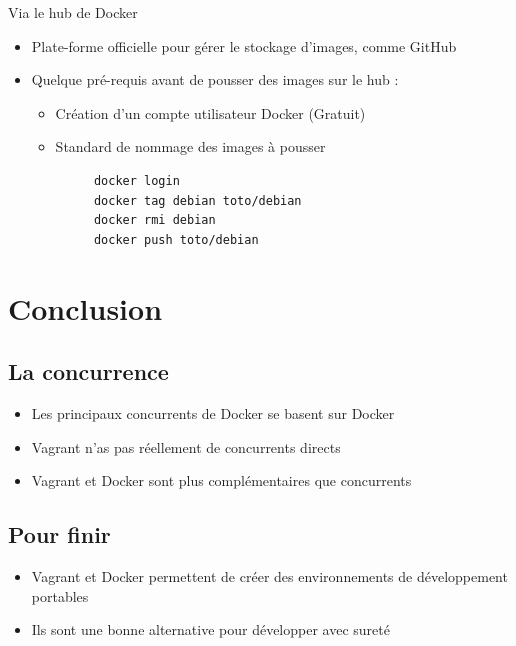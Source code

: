 \documentclass{beamer}
\begin{document}
    \begin{frame}[containsverbatim]{Via le hub de Docker}
       \begin{itemize}
          \item{Plate-forme officielle pour gérer le stockage d'images, comme GitHub}
          \item{Quelque pré-requis avant de pousser des images sur le hub :}
             \begin{itemize}
                \item{Création d'un compte utilisateur Docker (Gratuit)}
                \item{Standard de nommage des images à pousser}
             \end{itemize}
       \end{itemize}
       
       \begin{block}{}
          \begin{verbatim}
            docker login
            docker tag debian toto/debian
            docker rmi debian
            docker push toto/debian
          \end{verbatim}
       \end{block}
    \end{frame}




    \section{Conclusion}

    \subsection{La concurrence}
    \begin{frame}
       \begin{itemize}
          \item{Les principaux concurrents de Docker se basent sur Docker}
          \item{Vagrant n'as pas réellement de concurrents directs}
          \item{Vagrant et Docker sont plus complémentaires que concurrents}
       \end{itemize}
    \end{frame}

    \subsection{Pour finir}
    \begin{frame}
       \begin{itemize}
          \item{Vagrant et Docker permettent de créer des environnements de développement portables}
          \item{Ils sont une bonne alternative pour développer avec sureté}
       \end{itemize}
    \end{frame}
\end{document}
